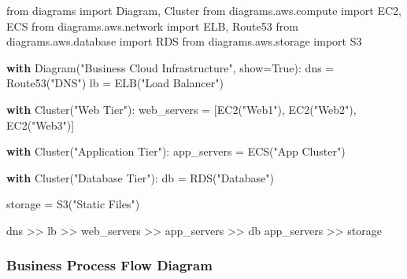 \documentclass[
  letterpaper,
  DIV=11,
  numbers=noendperiod]{scrreprt}
\newenvironment{Shaded}{\begin{snugshade}}{\end{snugshade}}
\newcommand{\ControlFlowTok}[1]{\textcolor[rgb]{0.00,0.23,0.31}{\textbf{#1}}}
\newcommand{\ImportTok}[1]{\textcolor[rgb]{0.00,0.46,0.62}{#1}}
\newcommand{\NormalTok}[1]{\textcolor[rgb]{0.00,0.23,0.31}{#1}}
\newcommand{\OperatorTok}[1]{\textcolor[rgb]{0.37,0.37,0.37}{#1}}
\newcommand{\StringTok}[1]{\textcolor[rgb]{0.13,0.47,0.30}{#1}}
\newcommand{\VariableTok}[1]{\textcolor[rgb]{0.07,0.07,0.07}{#1}}
\begin{document}
\begin{Shaded}
\begin{Highlighting}[]
\ImportTok{from}\NormalTok{ diagrams }\ImportTok{import}\NormalTok{ Diagram, Cluster}
\ImportTok{from}\NormalTok{ diagrams.aws.compute }\ImportTok{import}\NormalTok{ EC2, ECS}
\ImportTok{from}\NormalTok{ diagrams.aws.network }\ImportTok{import}\NormalTok{ ELB, Route53}
\ImportTok{from}\NormalTok{ diagrams.aws.database }\ImportTok{import}\NormalTok{ RDS}
\ImportTok{from}\NormalTok{ diagrams.aws.storage }\ImportTok{import}\NormalTok{ S3}

\ControlFlowTok{with}\NormalTok{ Diagram(}\StringTok{"Business Cloud Infrastructure"}\NormalTok{, show}\OperatorTok{=}\VariableTok{True}\NormalTok{):}
\NormalTok{    dns }\OperatorTok{=}\NormalTok{ Route53(}\StringTok{"DNS"}\NormalTok{)}
\NormalTok{    lb }\OperatorTok{=}\NormalTok{ ELB(}\StringTok{"Load Balancer"}\NormalTok{)}
    
    \ControlFlowTok{with}\NormalTok{ Cluster(}\StringTok{"Web Tier"}\NormalTok{):}
\NormalTok{        web\_servers }\OperatorTok{=}\NormalTok{ [EC2(}\StringTok{"Web1"}\NormalTok{), EC2(}\StringTok{"Web2"}\NormalTok{), EC2(}\StringTok{"Web3"}\NormalTok{)]}
    
    \ControlFlowTok{with}\NormalTok{ Cluster(}\StringTok{"Application Tier"}\NormalTok{):}
\NormalTok{        app\_servers }\OperatorTok{=}\NormalTok{ ECS(}\StringTok{"App Cluster"}\NormalTok{)}
    
    \ControlFlowTok{with}\NormalTok{ Cluster(}\StringTok{"Database Tier"}\NormalTok{):}
\NormalTok{        db }\OperatorTok{=}\NormalTok{ RDS(}\StringTok{"Database"}\NormalTok{)}
    
\NormalTok{    storage }\OperatorTok{=}\NormalTok{ S3(}\StringTok{"Static Files"}\NormalTok{)}
    
\NormalTok{    dns }\OperatorTok{\textgreater{}\textgreater{}}\NormalTok{ lb }\OperatorTok{\textgreater{}\textgreater{}}\NormalTok{ web\_servers }\OperatorTok{\textgreater{}\textgreater{}}\NormalTok{ app\_servers }\OperatorTok{\textgreater{}\textgreater{}}\NormalTok{ db}
\NormalTok{    app\_servers }\OperatorTok{\textgreater{}\textgreater{}}\NormalTok{ storage}
\end{Highlighting}
\end{Shaded}

\subsubsection{Business Process Flow
Diagram}\label{business-process-flow-diagram}
\end{document}

